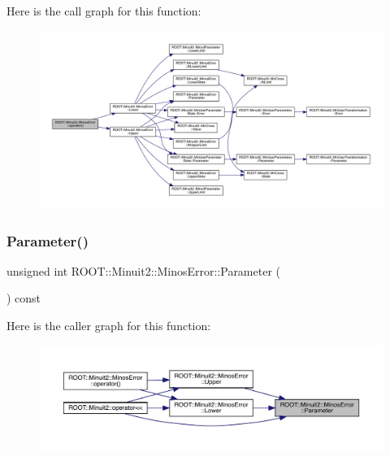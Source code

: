 Here is the call graph for this function\+:
\nopagebreak
\begin{figure}[H]
\begin{center}
\leavevmode
\includegraphics[width=350pt]{d2/dd1/classROOT_1_1Minuit2_1_1MinosError_ae5c75a96400736de9741f6c5b8314e31_cgraph}
\end{center}
\end{figure}
\mbox{\label{classROOT_1_1Minuit2_1_1MinosError_a5d4ac177a8075a3698dbecac3a8c552b}} 
\subsubsection{\texorpdfstring{Parameter()}{Parameter()}\hspace{0.1cm}{\footnotesize\ttfamily [1/2]}}
{\footnotesize\ttfamily unsigned int R\+O\+O\+T\+::\+Minuit2\+::\+Minos\+Error\+::\+Parameter (\begin{DoxyParamCaption}{ }\end{DoxyParamCaption}) const\hspace{0.3cm}{\ttfamily [inline]}}

Here is the caller graph for this function\+:\nopagebreak
\begin{figure}[H]
\begin{center}
\leavevmode
\includegraphics[width=350pt]{d2/dd1/classROOT_1_1Minuit2_1_1MinosError_a5d4ac177a8075a3698dbecac3a8c552b_icgraph}
\end{center}
\end{figure}
\mbox{\label{classROOT_1_1Minuit2_1_1MinosError_a5d4ac177a8075a3698dbecac3a8c552b}} 
